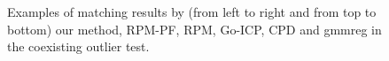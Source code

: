 \documentclass[11pt,bezier,]{article}
\begin{document}
\begin{figure}[!ht]

\caption{
Examples of matching results by (from left to right and from top to bottom)
our method, RPM-PF, RPM, Go-ICP, CPD and gmmreg
 in the  coexisting outlier  test.
\label{3D_match_exa}
}
\end{figure}
    
% 
\end{document}

